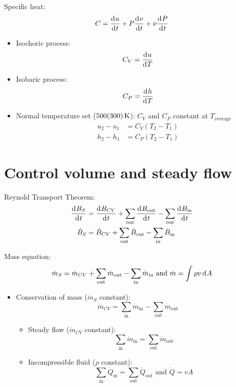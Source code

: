 \documentclass[10pt, twocolumn]{article}
\begin{document}
Specific heat:
\[
  C = \frac{\mathrm{d}^{} u}{\mathrm{d}^{} t} + P\frac{\mathrm{d}^{} \nu}{\mathrm{d}^{} t} + \nu\frac{\mathrm{d}^{} P}{\mathrm{d}^{} t}
\]
\begin{itemize}
  \item Isochoric process:
        \[
          C_V = \frac{\mathrm{d}^{} u}{\mathrm{d}^{} T}
        \]
  \item Isobaric process:
        \[
          C_P = \frac{\mathrm{d}^{} h}{\mathrm{d}^{} T}
        \]
  \item Normal temperature set (\(\SI[scientific-notation = false]{500+-300}{\kelvin}\)): \(C_V \) and \(C_P \) constant at \(T_{\mathrm{average}}\)
        \begin{align*}
          u_2 - u_1 & = C_V \left( T_2 - T_1 \right) \\
          h_2 - h_1 & = C_P \left( T_2 - T_1 \right)
        \end{align*}
\end{itemize}

\section{Control volume and steady flow}
Reynold Transport Theorem:
\begin{align*}
  \frac{\mathrm{d}^{} B_S}{\mathrm{d}^{} t} & = \frac{\mathrm{d}^{} B_{CV}}{\mathrm{d}^{} t} + \sum_{\mathrm{out}}{\frac{\mathrm{d}^{} B_{\mathrm{out}}}{\mathrm{d}^{} t}} - \sum_{\mathrm{out}}{\frac{\mathrm{d}^{} B_{\mathrm{in}}}{\mathrm{d}^{} t}} \\
  \dot{B}_S            & = {\dot{B}}_{CV} + \sum_{\mathrm{out}}{\dot{B}_{\mathrm{out}}} - \sum_{\mathrm{in}}{\dot{B}_{\mathrm{in}}}
\end{align*}

Mass equation:
\[
  \dot{m}_S = \dot{m}_{CV} + \sum_{\mathrm{out}}{\dot{m}_{\mathrm{out}}} - \sum_{\mathrm{in}}{\dot{m}_{\mathrm{in}}} \text{ and } \dot{m} = \int{\rho v\,\mathrm{d}^{} A}
\]

\begin{itemize}
  \item Conservation of mass (\(\dot{m}_S \) constant):
        \[
          \dot{m}_{CV} = \sum_{\mathrm{in}}{\dot{m}_{\mathrm{in}}} - \sum_{\mathrm{out}}{\dot{m}_{\mathrm{out}}}
        \]
        \begin{itemize}
          \item Steady flow (\(\dot{m}_{CV}\) constant):
                \[
                  \sum_{\mathrm{in}}{\dot{m}_{\mathrm{in}}} = \sum_{\mathrm{out}}{\dot{m}_{\mathrm{out}}}
                \]
          \item Incompressible fluid (\(\rho\) constant):
                \[
                  \sum_{\mathrm{in}}{\dot{Q}_{\mathrm{in}}} = \sum_{\mathrm{out}}{\dot{Q}_{\mathrm{out}}} \text{ and } \dot{Q} = vA
                \]
        \end{itemize}
\end{itemize}
\end{document}
